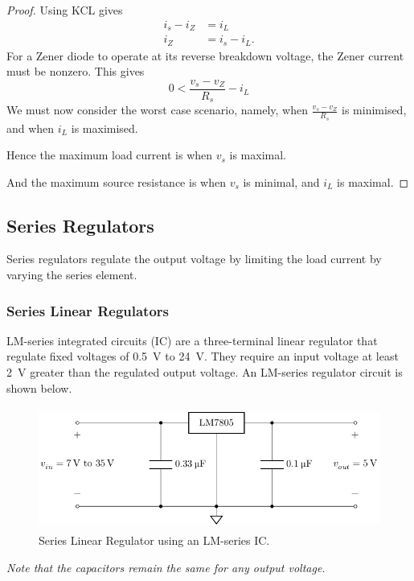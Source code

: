 \documentclass{article}
\begin{document}
\begin{proof}
    Using KCL gives
    \begin{align*}
        i_s - i_Z & = i_L        \\
        i_Z       & = i_s - i_L.
    \end{align*}
    For a Zener diode to operate at its reverse breakdown voltage, the Zener current
    must be nonzero. This gives
    \begin{equation*}
        0 < \frac{v_s - v_Z}{R_s} - i_L
    \end{equation*}
    We must now consider the worst case scenario, namely, when
    \(\displaystyle \frac{v_s - v_Z}{R_s}\) is minimised, and when \(i_L\) is maximised.

    Hence the maximum load current is when \(v_s\) is maximal.

    And the maximum source resistance is when \(v_s\) is minimal, and \(i_L\) is maximal.
\end{proof}
\subsection{Series Regulators}
\begin{definition}
    Series regulators regulate the output voltage by limiting the load current by varying the series element.
\end{definition}
\subsubsection{Series Linear Regulators}
LM-series integrated circuits (IC) are a three-terminal linear regulator that regulate fixed voltages of \qty{0.5}{V} to \qty{24}{V}.
They require an input voltage at least \qty{2}{V} greater than the regulated output voltage.
An LM-series regulator circuit is shown below.
\begin{figure}[H]
    \centering
    \includegraphics[height = 4cm, keepaspectratio = true]{figures/series_linear_regulator.pdf}
    \caption{Series Linear Regulator using an LM-series IC.}
\end{figure}
\emph{Note that the capacitors remain the same for any output voltage.}
\end{document}
